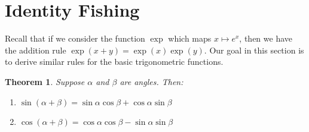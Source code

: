 \documentclass[a4paper,leqno]{article}
\numberwithin{equation}{section}
\newtheorem{thm}[equation]{Theorem}
\theoremstyle{definition}
\theoremstyle{remark}
\begin{document}
\section{Identity Fishing}
Recall that if we consider the function $ \exp $ which maps $ x \mapsto e^x $, then we have the addition rule $ \exp(x + y) = \exp(x) \exp(y) $. Our
goal in this section is to derive similar rules for the basic trigonometric functions.

\begin{thm}\leavevmode\label{thm:sumids}
  Suppose $ \alpha $ and $ \beta $ are angles. Then:
  \begin{enumerate}
    \item $ \sin(\alpha + \beta) = \sin \alpha \cos \beta + \cos \alpha \sin \beta $
    \item $ \cos(\alpha + \beta) = \cos \alpha \cos \beta - \sin \alpha \sin \beta $
  \end{enumerate}
\end{thm}
\end{document}
